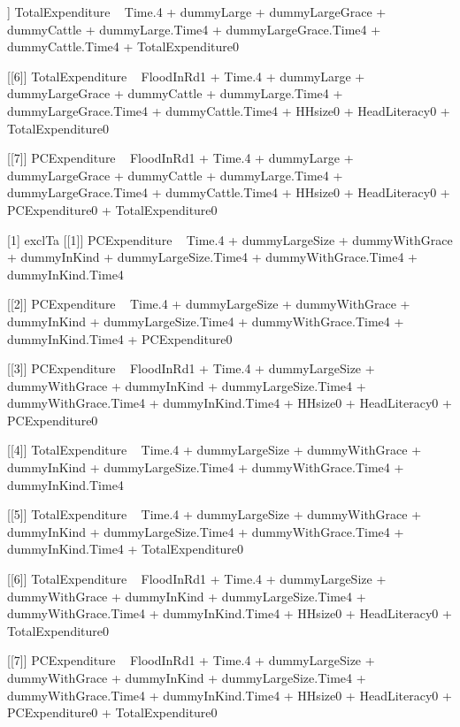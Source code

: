 \begin{Schunk}
\begin{Soutput}
[[5]]
TotalExpenditure ~ Time.4 + dummyLarge + dummyLargeGrace + dummyCattle + 
    dummyLarge.Time4 + dummyLargeGrace.Time4 + dummyCattle.Time4 + 
    TotalExpenditure0

[[6]]
TotalExpenditure ~ FloodInRd1 + Time.4 + dummyLarge + dummyLargeGrace + 
    dummyCattle + dummyLarge.Time4 + dummyLargeGrace.Time4 + 
    dummyCattle.Time4 + HHsize0 + HeadLiteracy0 + TotalExpenditure0

[[7]]
PCExpenditure ~ FloodInRd1 + Time.4 + dummyLarge + dummyLargeGrace + 
    dummyCattle + dummyLarge.Time4 + dummyLargeGrace.Time4 + 
    dummyCattle.Time4 + HHsize0 + HeadLiteracy0 + PCExpenditure0 + 
    TotalExpenditure0

[1] exclTa
[[1]]
PCExpenditure ~ Time.4 + dummyLargeSize + dummyWithGrace + dummyInKind + 
    dummyLargeSize.Time4 + dummyWithGrace.Time4 + dummyInKind.Time4

[[2]]
PCExpenditure ~ Time.4 + dummyLargeSize + dummyWithGrace + dummyInKind + 
    dummyLargeSize.Time4 + dummyWithGrace.Time4 + dummyInKind.Time4 + 
    PCExpenditure0

[[3]]
PCExpenditure ~ FloodInRd1 + Time.4 + dummyLargeSize + dummyWithGrace + 
    dummyInKind + dummyLargeSize.Time4 + dummyWithGrace.Time4 + 
    dummyInKind.Time4 + HHsize0 + HeadLiteracy0 + PCExpenditure0

[[4]]
TotalExpenditure ~ Time.4 + dummyLargeSize + dummyWithGrace + 
    dummyInKind + dummyLargeSize.Time4 + dummyWithGrace.Time4 + 
    dummyInKind.Time4

[[5]]
TotalExpenditure ~ Time.4 + dummyLargeSize + dummyWithGrace + 
    dummyInKind + dummyLargeSize.Time4 + dummyWithGrace.Time4 + 
    dummyInKind.Time4 + TotalExpenditure0

[[6]]
TotalExpenditure ~ FloodInRd1 + Time.4 + dummyLargeSize + dummyWithGrace + 
    dummyInKind + dummyLargeSize.Time4 + dummyWithGrace.Time4 + 
    dummyInKind.Time4 + HHsize0 + HeadLiteracy0 + TotalExpenditure0

[[7]]
PCExpenditure ~ FloodInRd1 + Time.4 + dummyLargeSize + dummyWithGrace + 
    dummyInKind + dummyLargeSize.Time4 + dummyWithGrace.Time4 + 
    dummyInKind.Time4 + HHsize0 + HeadLiteracy0 + PCExpenditure0 + 
    TotalExpenditure0
\end{Soutput}
\end{Schunk}




